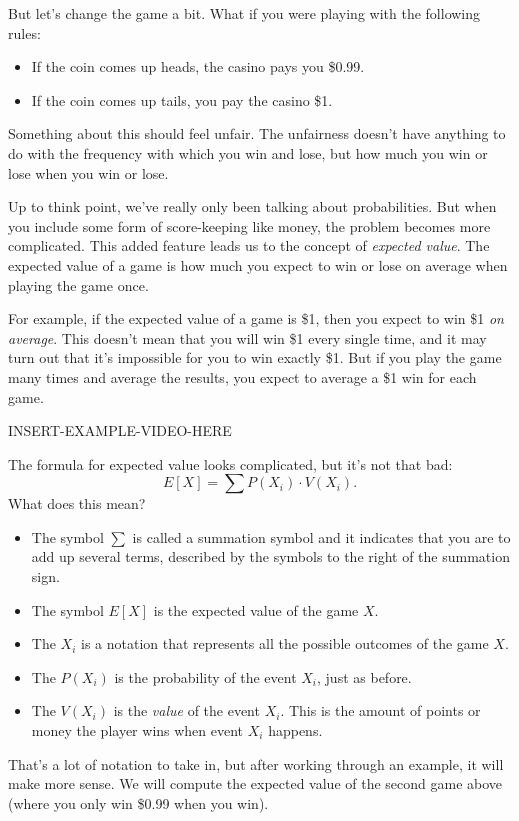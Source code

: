 \documentclass{ximera}
\begin{document}
But let's change the game a bit. What if you were playing with the following rules:
\begin{itemize}
  \item If the coin comes up heads, the casino pays you \$0.99.
  \item If the coin comes up tails, you pay the casino \$1.
\end{itemize}
Something about this should feel unfair. The unfairness doesn't have anything to do with the frequency with which you win and lose, but how much you win or lose when you win or lose.

Up to think point, we've really only been talking about probabilities. But when you include some form of score-keeping like money, the problem becomes more complicated. This added feature leads us to the concept of \emph{expected value}. The expected value of a game is how much you expect to win or lose on average when playing the game once.

For example, if the expected value of a game is \$1, then you expect to win \$1 \emph{on average}. This doesn't mean that you will win \$1 every single time, and it may turn out that it's impossible for you to win exactly \$1. But if you play the game many times and average the results, you expect to average a \$1 win for each game.

INSERT-EXAMPLE-VIDEO-HERE

The formula for expected value looks complicated, but it's not that bad:
\[ E[X] = \sum P(X_i) \cdot V(X_i). \]
What does this mean?
\begin{itemize}
  \item The symbol $\sum$ is called a summation symbol and it indicates that you are to add up several terms, described by the symbols to the right of the summation sign.
  \item The symbol $E[X]$ is the expected value of the game $X$.
  \item The $X_i$ is a notation that represents all the possible outcomes of the game $X$.
  \item The $P(X_i)$ is the probability of the event $X_i$, just as before.
  \item The $V(X_i)$ is the \emph{value} of the event $X_i$. This is the amount of points or money the player wins when event $X_i$ happens.
\end{itemize}

That's a lot of notation to take in, but after working through an example, it will make more sense. We will compute the expected value of the second game above (where you only win \$0.99 when you win).
\end{document}
